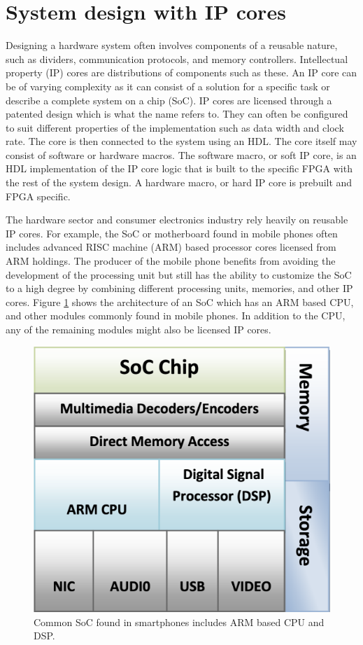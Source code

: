 \documentclass[12pt]{report}
\begin{document}
\section{System design with IP cores}
Designing a hardware system often involves components of a reusable nature, such as dividers, communication protocols, and memory controllers. Intellectual property (IP) cores are distributions of components such as these. An IP core can be of varying complexity as it can consist of a solution for a specific task or describe a complete system on a chip (SoC). IP cores are licensed through a patented design which is what the name refers to. They can often be configured to suit different properties of the implementation such as data width and clock rate. The core is then connected to the system using an HDL. The core itself may consist of software or hardware macros. The software macro, or soft IP core, is an HDL implementation of the IP core logic that is built to the specific FPGA with the rest of the system design. A hardware macro, or hard IP core is prebuilt and FPGA specific. \citep{EERefBook} \citep{XilVivado}
\par
The hardware sector and consumer electronics industry rely heavily on reusable IP cores. For example, the SoC or motherboard found in mobile phones often includes advanced RISC machine (ARM) based processor cores licensed from ARM holdings. The producer of the mobile phone benefits from avoiding the development of the processing unit but still has the ability to customize the SoC to a high degree by combining different processing units, memories, and other IP cores. Figure \ref{fig:6} shows the architecture of an SoC which has an ARM based CPU, and other modules commonly found in mobile phones. In addition to the CPU, any of the remaining modules might also be licensed IP cores. \citep{ArmInMobile} \citep{HarvIPCore}

\begin{figure}[h]
    \centering
    \includegraphics[scale=0.25]{figures/arm_soc.png}
    \caption{Common SoC found in smartphones includes ARM based CPU and DSP. \citep{ArmInMobile}}
    \label{fig:6}
\end{figure}
\end{document}
